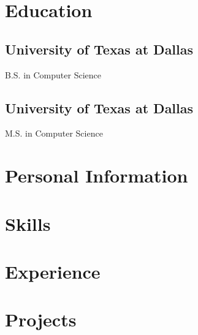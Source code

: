 \documentclass{fortythree_resume}
\begin{document}

\begin{minipage}[t]{0.33\textwidth}

\section{Education}
\subsection{University of Texas at Dallas}
B.S. in Computer Science
\subsection{University of Texas at Dallas}
M.S. in Computer Science
\sectionsep

\section{Personal Information}
\sectionsep

\section{Skills}
\sectionsep

\end{minipage}
\hfill
\begin{minipage}[t]{0.66\textwidth} 

\section{Experience}
\sectionsep

\section{Projects}
\sectionsep

\end{minipage}
\end{document}
